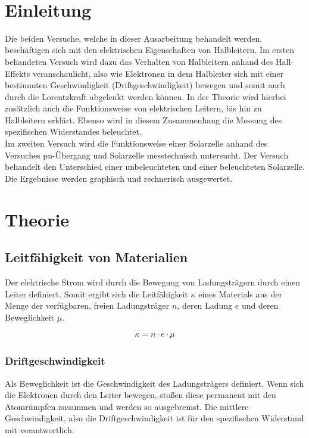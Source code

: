 \documentclass[a4paper]{scrartcl}
\def\header#1#2{
  \begin{center}
    {\Large #1}\\
    {#2}
  \end{center}
}
\numberwithin{equation}{subsection}
\begin{document}
\vspace{10pt}
\header{\HEADDING}{\SUBHEADDING}

\tableofcontents

\newpage

\section{Einleitung}
Die beiden Versuche, welche in dieser Ausarbeitung behandelt werden, beschäftigen sich mit den elektrischen Eigenschaften von Halbleitern. Im ersten behandeten Versuch wird dazu das Verhalten von Halbleitern anhand des Hall-Effekts veranschaulicht, also wie Elektronen in dem Halbleiter sich mit einer bestimmten Geschwindigkeit (Driftgeschwindigkeit) bewegen und somit auch durch die Lorentzkraft abgelenkt werden können. In der Theorie wird hierbei zusätzlich auch die Funktionsweise von elektrischen Leitern, bis hin zu Halbleitern erklärt.
Ebenso wird in diesem Zusammenhang die Messung des spezifischen Widerstandes beleuchtet.
\\
Im zweiten Versuch wird die Funktionsweise einer Solarzelle anhand des Versuches
\glqq pn-Übergang und Solarzelle\grqq \hspace{0cm} messtechnisch untersucht. Der Versuch behandelt
den Unterschied einer unbeleuchteten und einer beleuchteten Solarzelle. Die Ergebnisse werden graphisch
und rechnerisch ausgewertet.


\newpage

\section{Theorie}
\subsection{Leitfähigkeit von Materialien}
Der elektrische Strom wird durch die Bewegung von Ladungsträgern durch einen Leiter definiert.
Somit ergibt sich die Leitfähigkeit $\kappa$ eines Materials aus der Menge der verfügbaren, freien Ladungsträger $n$, deren Ladung $e$ und deren Beweglichkeit $\mu$. \cite{horn}

\begin{align}
\kappa = n \cdot e \cdot \mu
\end{align}

\subsubsection{Driftgeschwindigkeit}
Als Beweglichkeit ist die Geschwindigkeit des Ladungsträgers definiert. Wenn sich die Elektronen durch den Leiter bewegen, stoßen diese permanent mit den Atomrümpfen zusammen und werden so ausgebremst. Die mittlere Geschwindigkeit, also die Driftgeschwindigkeit ist für den spezifischen Widerstand mit verantwortlich. \cite{werk}
\end{document}

